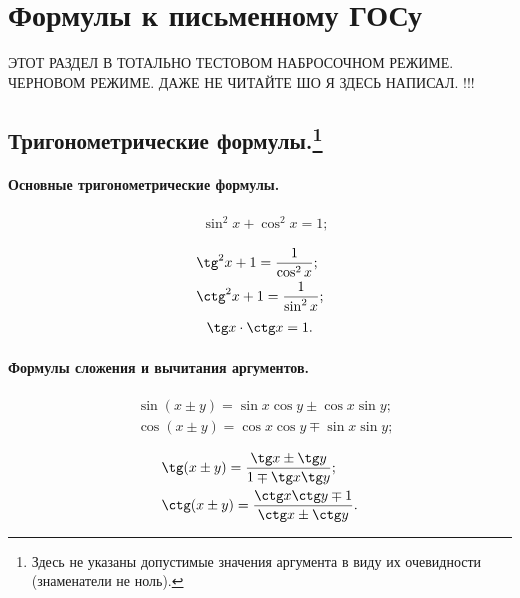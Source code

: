 \chapter{Формулы к письменному ГОСу}

ЭТОТ РАЗДЕЛ В ТОТАЛЬНО ТЕСТОВОМ НАБРОСОЧНОМ РЕЖИМЕ. ЧЕРНОВОМ РЕЖИМЕ. ДАЖЕ НЕ ЧИТАЙТЕ ШО Я ЗДЕСЬ НАПИСАЛ.
!!!
\section[Тригонометрические формулы.]{Тригонометрические формулы.\footnote{Здесь не указаны допустимые значения аргумента в виду их очевидности (знаменатели не ноль).}}
\subsubsection{Основные тригонометрические формулы.}
\vspace*{-1.8\baselineskip}
\begin{multicols}{3}
\begin{align*}
&\sin^2x+\cos^2x=1;\\
\end{align*}
\vfill
\columnbreak
\begin{align*}
&\tg^2x+1=\frac{1}{\cos^2x};\\
&\ctg^2x+1=\frac{1}{\sin^2x};
\end{align*}
\vfill
\columnbreak
\begin{align*}
&\tg x\cdot\ctg x=1.\\
\end{align*}
\vfill
\end{multicols}
\subsubsection{Формулы сложения и вычитания аргументов.}
\vspace*{-1.8\baselineskip}
\begin{multicols}{2}
\begin{align*}
&\sin(x\pm y)=\sin x \cos y \pm \cos x \sin y;\\
&\cos(x\pm y)= \cos x \cos y \mp \sin x \sin y;\\
\end{align*}
\vfill
\columnbreak
\begin{align*}
&\tg(x\pm y)=\frac{\tg x \pm \tg y}{1 \mp \tg x\tg y};\\
&\ctg(x\pm y)=\frac{\ctg x\ctg y \mp 1}{\ctg x \pm \ctg y}.
\end{align*}
\end{multicols}
